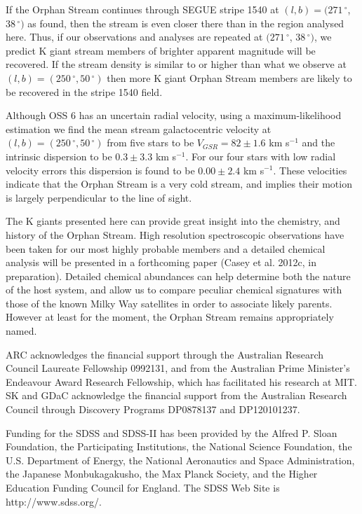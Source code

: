 \documentclass{emulateapj}
\begin{document}
If the Orphan Stream continues through SEGUE stripe 1540 at $(l, b) = (271\,^\circ$, $38\,^\circ)$ as \citet{Newberg;et-al_2010} found, then the stream is even closer there than in the region analysed here. Thus, if our observations and analyses are repeated at $(271\,^\circ$, $38\,^\circ)$, we predict K giant stream members of brighter apparent magnitude will be recovered. If the stream density is similar to or higher than what we observe at $(l, b) = (250\,^\circ, 50\,^\circ)$ then more K giant Orphan Stream members are likely to be recovered in the stripe 1540 field.

Although OSS 6 has an uncertain radial velocity, using a maximum-likelihood estimation we find the mean stream galactocentric velocity at $(l, b) = (250\,^\circ, 50\,^\circ)$ from five stars to be $V_{GSR} = 82 \pm 1.6$ km s$^{-1}$ and the intrinsic dispersion to be $0.3 \pm 3.3$ km s$^{-1}$. For our four stars with low radial velocity errors this dispersion is found to be $0.00 \pm 2.4$ km s$^{-1}$. These velocities indicate that the Orphan Stream is a very cold stream, and implies their motion is largely perpendicular to the line of sight.

The K giants presented here can provide great insight into the chemistry, and history of the Orphan Stream. High resolution spectroscopic observations have been taken for our most highly probable members and a detailed chemical analysis will be presented in a forthcoming paper (Casey et al. 2012c, in preparation). Detailed chemical abundances can help determine both the nature of the host system, and allow us to compare peculiar chemical signatures with those of the known Milky Way satellites in order to associate likely parents. However at least for the moment, the Orphan Stream remains appropriately named.


\acknowledgements
ARC acknowledges the financial support through the Australian Research Council Laureate Fellowship 0992131, and from the Australian Prime Minister's Endeavour Award Research Fellowship, which has facilitated his research at MIT. SK and GDaC acknowledge the financial support from the Australian Research Council through Discovery Programs DP0878137 and DP120101237.

Funding for the SDSS and SDSS-II has been provided by the Alfred P. Sloan Foundation, the Participating Institutions, the National Science Foundation, the U.S. Department of Energy, the National Aeronautics and Space Administration, the Japanese Monbukagakusho, the Max Planck Society, and the Higher Education Funding Council for England. The SDSS Web Site is http://www.sdss.org/.
\end{document}
